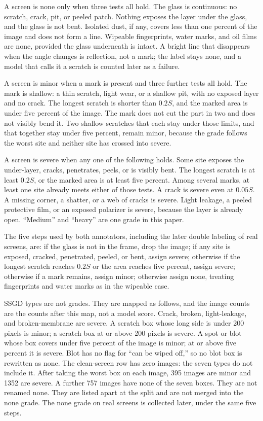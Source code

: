 \documentclass[10pt]{article}
\begin{document}
A screen is none only when three tests all hold. The glass is continuous: no scratch, crack, pit, or peeled patch. Nothing exposes the layer under the glass, and the glass is not bent. Isolated dust, if any, covers less than one percent of the image and does not form a line. Wipeable fingerprints, water marks, and oil films are none, provided the glass underneath is intact. A bright line that disappears when the angle changes is reflection, not a mark; the label stays none, and a model that calls it a scratch is counted later as a failure.

A screen is minor when a mark is present and three further tests all hold. The mark is shallow: a thin scratch, light wear, or a shallow pit, with no exposed layer and no crack. The longest scratch is shorter than $0.2S$, and the marked area is under five percent of the image. The mark does not cut the part in two and does not visibly bend it. Two shallow scratches that each stay under those limits, and that together stay under five percent, remain minor, because the grade follows the worst site and neither site has crossed into severe.

A screen is severe when any one of the following holds. Some site exposes the under-layer, cracks, penetrates, peels, or is visibly bent. The longest scratch is at least $0.2S$, or the marked area is at least five percent. Among several marks, at least one site already meets either of those tests. A crack is severe even at $0.05S$. A missing corner, a shatter, or a web of cracks is severe. Light leakage, a peeled protective film, or an exposed polarizer is severe, because the layer is already open. ``Medium'' and ``heavy'' are one grade in this paper.

The five steps used by both annotators, including the later double labeling of real screens, are: if the glass is not in the frame, drop the image; if any site is exposed, cracked, penetrated, peeled, or bent, assign severe; otherwise if the longest scratch reaches $0.2S$ or the area reaches five percent, assign severe; otherwise if a mark remains, assign minor; otherwise assign none, treating fingerprints and water marks as in the wipeable case.

SSGD types are not grades. They are mapped as follows, and the image counts are the counts after this map, not a model score. Crack, broken, light-leakage, and broken-membrane are severe. A scratch box whose long side is under 200 pixels is minor; a scratch box at or above 200 pixels is severe. A spot or blot whose box covers under five percent of the image is minor; at or above five percent it is severe. Blot has no flag for ``can be wiped off,'' so no blot box is rewritten as none. The clean-screen row has zero images: the seven types do not include it. After taking the worst box on each image, 395 images are minor and 1352 are severe. A further 757 images have none of the seven boxes. They are not renamed none. They are listed apart at the split and are not merged into the none grade. The none grade on real screens is collected later, under the same five steps.
\end{document}
